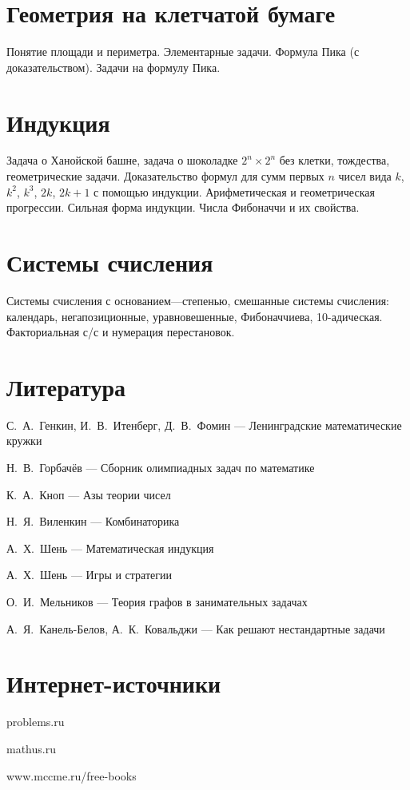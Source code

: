 \documentclass[a4paper,11pt,landscape]{article}
\begin{document}
\begin{paracol}{2}

\setlength{\columnsep}{0.9cm}

\setcounter{section}{12}

\section{Геометрия на клетчатой бумаге}

Понятие площади и периметра. Элементарные задачи. Формула Пика (с доказательством). Задачи на формулу Пика.

\section{Индукция}

Задача о Ханойской башне, задача о шоколадке $2^n \times 2^n$ без клетки, тождества, геометрические задачи. Доказательство формул для сумм первых $n$ чисел вида $k$, $k^2$\!, $k^3$\!, $2k$, $2k+1$ с помощью индукции. Арифметическая и геометрическая прогрессии. Сильная форма индукции. Числа Фибоначчи и их свойства.

\section{Системы счисления}

Системы счисления с основанием—степенью, смешанные системы счисления: календарь, негапозиционные, уравновешенные, Фибоначчиева, 10-адическая. Факториальная с/с и нумерация перестановок.

\switchcolumn

\section*{Литература}

С.~А.~Генкин, И.~В.~Итенберг, Д.~В.~Фомин — Ленинградские математические кружки

Н.~В.~Горбачёв — Сборник олимпиадных задач по математике

К.~А.~Кноп — Азы теории чисел

Н.~Я.~Виленкин — Комбинаторика

А.~Х.~Шень — Математическая индукция

А.~Х.~Шень — Игры и стратегии

О.~И.~Мельников — Теория графов в занимательных задачах

А.~Я.~Канель-Белов, А.~К.~Ковальджи — Как решают нестандартные задачи

\section*{Интернет-источники}

problems.ru

mathus.ru

www.mccme.ru/free-books

\end{paracol}
\end{document}
